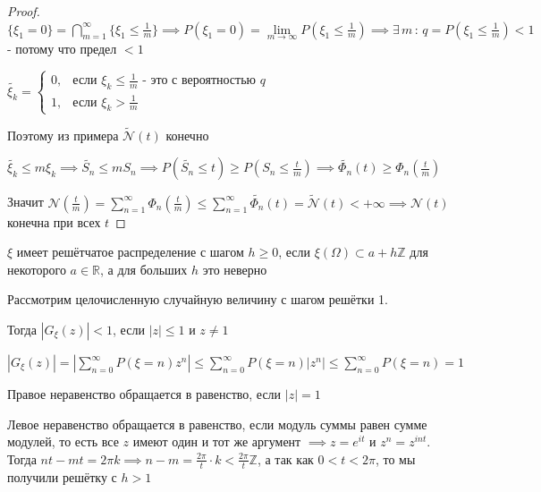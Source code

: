 \begin{proof}
    $\{ \xi_1 = 0 \} = \bigcap\limits_{m=1}^\infty \{ \xi_1 \leqslant \frac{1}{m} \} \implies P(\xi_1 = 0) = \lim\limits_{m \to \infty} P(\xi_1 \leqslant \frac{1}{m}) \implies \exists \, m \, : \, q = P(\xi_1 \leqslant \frac{1}{m}) < 1$ - потому что предел $< 1$

    $\tilde{\xi_k} = 
    \begin{cases}
        0, & \text{если $\xi_k \leqslant \frac{1}{m}$ - это с вероятностью $q$} \\
        1, & \text{если $\xi_k > \frac{1}{m}$}    
    \end{cases}$

    Поэтому из примера $\tilde{\mathcal{N}} (t)$ конечно

    $\tilde{\xi_k} \leqslant m \xi_k \implies \tilde{S_n} \leqslant mS_n \implies P(\tilde{S_n} \leqslant t) \geqslant P(S_n \leqslant \frac{t}{m}) \implies \tilde{\Phi_n} (t) \geqslant \Phi_n \left(\frac{t}{m}\right) $

    Значит $\mathcal{N} \left( \frac{t}{m} \right) = \sum\limits_{n=1}^\infty \Phi_n \left( \frac{t}{m} \right) \leqslant \sum\limits_{n=1}^\infty \tilde{\Phi_n} (t) = \tilde{\mathcal{N}} (t) < +\infty \implies \mathcal{N} (t)$ конечна при всех $t$
\end{proof}

\begin{definition}
    $\xi$ имеет решётчатое распределение с шагом $h \geqslant 0$, если $\xi (\Omega) \subset a + h\mathbb{Z}$ для некоторого $a \in \mathbb{R}$, а для больших $h$ это неверно

    \begin{remark}
        Рассмотрим целочисленную случайную величину с шагом решётки 1.

        Тогда $ \left| G_{\xi} (z) \right| < 1$, если $|z| \leqslant 1$ и $z \neq 1$

        $\left| G_{\xi} (z) \right| = \left| \sum\limits_{n=0}^\infty P(\xi = n) z^n \right| \leqslant \sum\limits_{n=0}^\infty P(\xi = n) |z^n| \leqslant \sum\limits_{n=0}^\infty P(\xi = n) = 1$

        Правое неравенство обращается в равенство, если $|z| = 1$

        Левое неравенство обращается в равенство, если модуль суммы равен сумме модулей, то есть все $z$ имеют один и тот же аргумент $\implies z = e^{it}$ и $z^n = z^{int}$. Тогда 
        $nt - mt = 2\pi k \implies n - m = \frac{2\pi}{t} \cdot k < \frac{2\pi}{t} \mathbb{Z}$, а так как $0 < t < 2\pi$, то мы получили решётку с $h > 1$
    \end{remark}
\end{definition}

